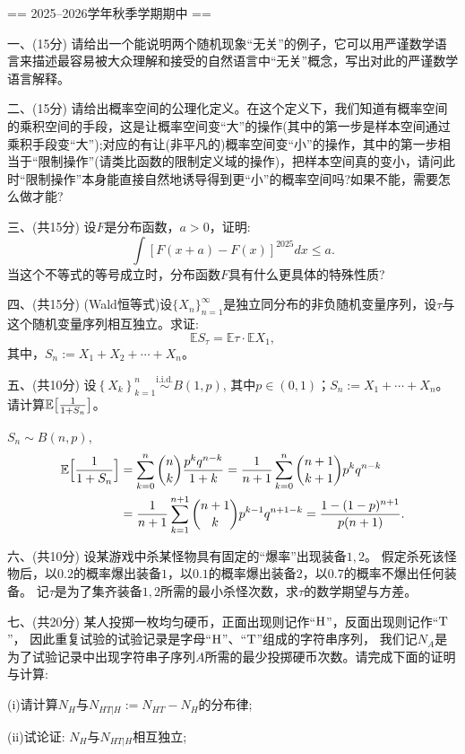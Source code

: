 == 2025--2026学年秋季学期期中 ==

一、(15分) 请给出一个能说明两个随机现象“无关”的例子，它可以用严谨数学语言来描述最容易被大众理解和接受的自然语言中“无关”概念，写出对此的严谨数学语言解释。

二、(15分) 请给出概率空间的公理化定义。在这个定义下，我们知道有概率空间的乘积空间的手段，这是让概率空间变“大”的操作(其中的第一步是样本空间通过乘积手段变“大”);对应的有让(非平凡的)概率空间变“小”的操作，其中的第一步相当于“限制操作”(请类比函数的限制定义域的操作)，把样本空间真的变小，请问此时“限制操作”本身能直接自然地诱导得到更“小”的概率空间吗?如果不能，需要怎么做才能?

三、(共15分) 设$F$是分布函数，$a>0$，证明:
\[\int [F(x+a)-F(x)]^{2025}  dx \leq a.\]
当这个不等式的等号成立时，分布函数$F$具有什么更具体的特殊性质?

四、(共15分) (Wald恒等式)设${\{X_n\}}_{n=1}^{\infty}$是独立同分布的非负随机变量序列，设$\tau$与这个随机变量序列相互独立。求证:
\[\mathbb{E}{S}_{\tau}=\mathbb{E}{\tau}\cdot\mathbb{E}{X_1},\]
其中，$S_n:=X_1+X_2+\cdots+X_n$。

五、(共10分) 设$\left\{X_k\right\}_{k=1}^{n}\mathop{\sim}\limits^{\text{i.i.d.}} B(1,p)$, 
其中$p\in(0,1)$；$S_n:=X_1+\cdots+X_n$。请计算$\mathbb{E}\big[\frac{1}{1+S_n}\big]$。

\begin{proofc}[解答]
    $S_n\sim B(n,p)$, 
    \begin{align*}\mathbb{E}\Big[\frac{1}{1+S_n}\Big]
    &=\sum_{k=0}^n\binom{n}{k}\frac{p^kq^{n-k}}{1+k}
    =\frac{1}{n+1}\sum_{k=0}^n\binom{n+1}{k+1}p^kq^{n-k}\\
    &=\frac{1}{n+1}\sum_{k=1}^{n+1}\binom{n+1}{k}p^{k-1}q^{n+1-k}
    =\frac{1-(1-p)^{n+1}}{p(n+1)}.\end{align*}
\end{proofc}

六、(共10分) 设某游戏中杀某怪物具有固定的“爆率”出现装备$1,2$。
假定杀死该怪物后，以$0.2$的概率爆出装备$1$，以$0.1$的概率爆出装备$2$，以$0.7$的概率不爆出任何装备。
记$\tau$是为了集齐装备$1,2$所需的最小杀怪次数，求$\tau$的数学期望与方差。


七、(共20分) 某人投掷一枚均匀硬币，正面出现则记作“$\mathrm{H}$”，反面出现则记作“$\mathrm{T}$”，
因此重复试验的试验记录是字母“$\mathrm{H}$”、“$\mathrm{T}$”组成的字符串序列，
我们记$N_A$是为了试验记录中出现字符串子序列$A$所需的最少投掷硬币次数。请完成下面的证明与计算:

(i)请计算$N_H$与$N_{HT|H}:=N_{HT}-N_H$的分布律;

(ii)试论证: $N_H$与$N_{HT|H}$相互独立;


